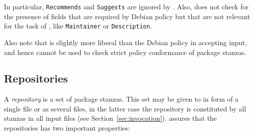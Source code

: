 In particular, \texttt{Recommends} and \texttt{Suggests} are ignored
by \debcheck. Also, \debcheck{} does not check for the presence of
fields that are required by Debian policy but that are not relevant
for the task of \debcheck, like \texttt{Maintainer} or
\texttt{Description}.

Also note that \debcheck{} is slightly more liberal than the Debian
policy in accepting input, and hence cannot be used to check strict
policy conformance of package stanzas.

\subsection{Repositories}
\label{sec:repositories}
A \emph{repository} is a set of package stanzas. This set may be given
to \debcheck{} in form of a single file or as several files, in the
latter case the repository is constituted by all stanzas in all input
files (see Section~\ref{sec:invocation}). \debcheck{} assures that the
repositories has two important properties:

